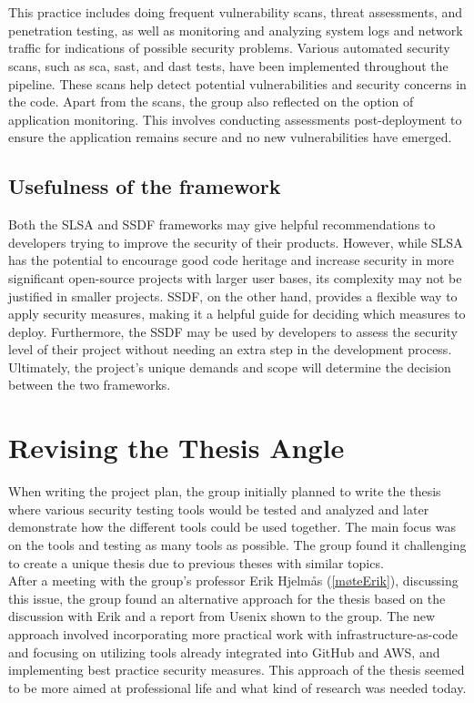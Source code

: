 \\~\\
This practice includes doing frequent vulnerability scans, threat assessments, and penetration testing, as well as monitoring and analyzing system logs and network traffic for indications of possible security problems. Various automated security scans, such as \acrshort{sca}, \acrshort{sast}, and \acrshort{dast} tests, have been implemented throughout the pipeline. These scans help detect potential vulnerabilities and security concerns in the code. Apart from the scans, the group also reflected on the option of application monitoring. This involves conducting assessments post-deployment to ensure the application remains secure and no new vulnerabilities have emerged.

\subsection{Usefulness of the framework}

Both the SLSA and SSDF frameworks may give helpful recommendations to developers trying to improve the security of their products. However, while SLSA has the potential to encourage good code heritage and increase security in more significant open-source projects with larger user bases, its complexity may not be justified in smaller projects. SSDF, on the other hand, provides a flexible way to apply security measures, making it a helpful guide for deciding which measures to deploy. Furthermore, the SSDF may be used by developers to assess the security level of their project without needing an extra step in the development process. Ultimately, the project's unique demands and scope will determine the decision between the two frameworks.

\section{Revising the Thesis Angle}
When writing the project plan, the group initially planned to write the thesis where various security testing tools would be tested and analyzed and later demonstrate how the different tools could be used together. The main focus was on the tools and testing as many tools as possible. The group found it challenging to create a unique thesis due to previous theses with similar topics. 
\\
After a meeting with the group's professor Erik Hjelmås  (\ref{møteErik}), discussing this issue, the group found an alternative approach for the thesis based on the discussion with Erik and a report from Usenix \cite{usenixreport} shown to the group. The new approach involved incorporating more practical work with infrastructure-as-code and focusing on utilizing tools already integrated into GitHub and AWS, and implementing best practice security measures. This approach of the thesis seemed to be more aimed at professional life and what kind of research was needed today.  


